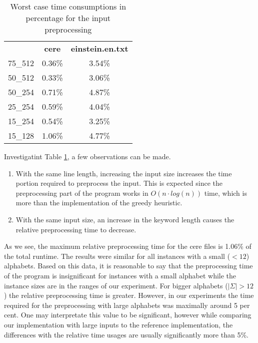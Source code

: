 \documentclass[english,twoside,censored,csm,algorithms-track-2020]{HYthesisML}
\theoremstyle{plain}
\theoremstyle{definition}
\begin{document}
\begin{center}
\begin{table}
\begin{tabular}{l | c c}
  & \textbf{cere} & \textbf{einstein.en.txt} \\
  75\_512 & 0.36\% & 3.54\% \\
  50\_512 & 0.33\% & 3.06\% \\
  50\_254 & 0.71\% & 4.87\% \\
  25\_254 & 0.59\% & 4.04\% \\
  15\_254 & 0.54\% & 3.25\% \\
  15\_128 & 1.06\% & 4.77\% \\
\end{tabular}
  \caption{Worst case time consumptions in percentage for the input preprocessing}
  \label{table-duplicate-time}
\end{table}
\end{center}

Investigatint Table \ref{table-duplicate-time}, a few observations can be made.

\begin{enumerate}
\item With the same line length, increasing the input size increases the time portion required to preprocess the input. This is expected since the preprocessing part of the program works in $O(n\cdot log(n))$ time, which is more than the implementation of the greedy heuristic.
\item With the same input size, an increase in the keyword length causes the relative preprocessing time to decrease. 
\end{enumerate}

As we see, the maximum relative preprocessing time for the cere files is 1.06\% of the total runtime.
The results were similar for all instances with a small ($<12$) alphabets. Based on this data,
it is reasonable to say that the preprocessing time of the program is insignificant for instances
with a small alphabet while the instance sizes are in the ranges of our experiment. For bigger
alphabets ($|\Sigma|>12$) the relative preprocessing time is greater. However, in our experiments
the time required for the preprocessing with large alphabets was maximally around 5 per cent. One may
interpretate this value to be significant, however while comparing our implementation with large
inputs to the reference implementation, the differences with the relative time usages are usually
significantly more than 5\%.
\end{document}
